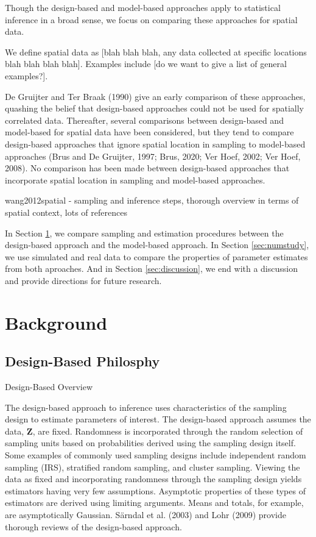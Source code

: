 \documentclass[]{elsarticle} %
\begin{document}
Though the design-based and model-based approaches apply to statistical
inference in a broad sense, we focus on comparing these approaches for
spatial data.

We define spatial data as {[}blah blah blah, any data collected at
specific locations blah blah blah blah{]}. Examples include {[}do we
want to give a list of general examples?{]}.

De Gruijter and Ter Braak (1990) give an early comparison of these
approaches, quashing the belief that design-based approaches could not
be used for spatially correlated data. Thereafter, several comparisons
between design-based and model-based for spatial data have been
considered, but they tend to compare design-based approaches that ignore
spatial location in sampling to model-based approaches (Brus and De
Gruijter, 1997; Brus, 2020; Ver Hoef, 2002; Ver Hoef, 2008). No
comparison has been made between design-based approaches that
incorporate spatial location in sampling and model-based approaches.

wang2012spatial - sampling and inference steps, thorough overview in
terms of spatial context, lots of references

In Section \ref{sec:background}, we compare sampling and estimation
procedures between the design-based approach and the model-based
approach. In Section \ref{sec:numstudy}, we use simulated and real data
to compare the properties of parameter estimates from both aproaches.
And in Section \ref{sec:discussion}, we end with a discussion and
provide directions for future research.

\hypertarget{sec:background}{%
\section{Background}\label{sec:background}}

\hypertarget{design-based-philosphy}{%
\subsection{Design-Based Philosphy}\label{design-based-philosphy}}

Design-Based Overview

The design-based approach to inference uses characteristics of the
sampling design to estimate parameters of interest. The design-based
approach assumes the data, \(\mathbf{Z}\), are fixed. Randomness is
incorporated through the random selection of sampling units based on
probabilities derived using the sampling design itself. Some examples of
commonly used sampling designs include independent random sampling
(IRS), stratified random sampling, and cluster sampling. Viewing the
data as fixed and incorporating randomness through the sampling design
yields estimators having very few assumptions. Asymptotic properties of
these types of estimators are derived using limiting arguments. Means
and totals, for example, are asymptotically Gaussian. Särndal et al.
(2003) and Lohr (2009) provide thorough reviews of the design-based
approach.
\end{document}
